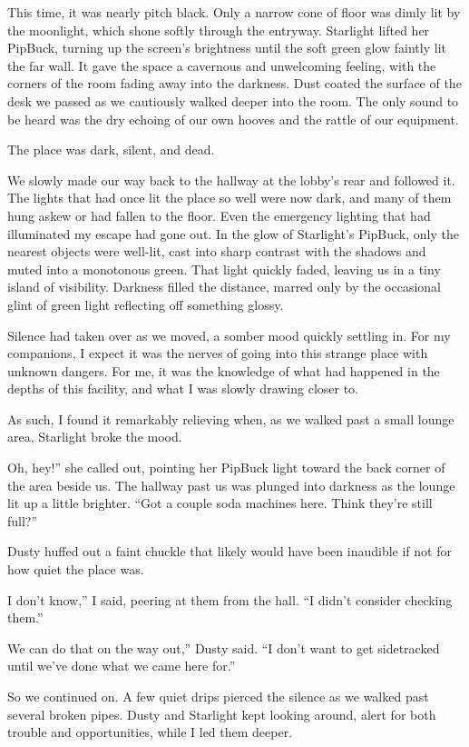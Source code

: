This time, it was nearly pitch black. Only a narrow cone of floor was dimly lit by the moonlight, which shone softly through the entryway. Starlight lifted her PipBuck, turning up the screen’s brightness until the soft green glow faintly lit the far wall. It gave the space a cavernous and unwelcoming feeling, with the corners of the room fading away into the darkness. Dust coated the surface of the desk we passed as we cautiously walked deeper into the room. The only sound to be heard was the dry echoing of our own hooves and the rattle of our equipment.

The place was dark, silent, and dead.

We slowly made our way back to the hallway at the lobby’s rear and followed it. The lights that had once lit the place so well were now dark, and many of them hung askew or had fallen to the floor. Even the emergency lighting that had illuminated my escape had gone out. In the glow of Starlight’s PipBuck, only the nearest objects were well-lit, cast into sharp contrast with the shadows and muted into a monotonous green. That light quickly faded, leaving us in a tiny island of visibility. Darkness filled the distance, marred only by the occasional glint of green light reflecting off something glossy.

Silence had taken over as we moved, a somber mood quickly settling in. For my companions, I expect it was the nerves of going into this strange place with unknown dangers. For me, it was the knowledge of what had happened in the depths of this facility, and what I was slowly drawing closer to.

As such, I found it remarkably relieving when, as we walked past a small lounge area, Starlight broke the mood.

\leavevmode{}Oh, hey!” she called out, pointing her PipBuck light toward the back corner of the area beside us. The hallway past us was plunged into darkness as the lounge lit up a little brighter. “Got a couple soda machines here. Think they’re still full?”

Dusty huffed out a faint chuckle that likely would have been inaudible if not for how quiet the place was.

\leavevmode{}I don’t know,” I said, peering at them from the hall. “I didn’t consider checking them.”

\leavevmode{}We can do that on the way out,” Dusty said. “I don’t want to get sidetracked until we’ve done what we came here for.”

So we continued on. A few quiet drips pierced the silence as we walked past several broken pipes. Dusty and Starlight kept looking around, alert for both trouble and opportunities, while I led them deeper.

